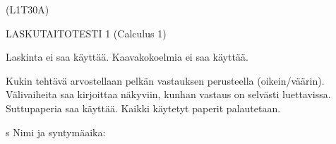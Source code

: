 \documentclass[finnish, a4paper, 12pt]{article}
\begin{document}
	
	
	\begin{flushright}
		(L1T30A)	%
	\end{flushright}
	
	\begin{center}
		{\large
			LASKUTAITOTESTI 1 (Calculus 1)}
	\end{center}
	
	Laskinta ei saa käyttää. Kaavakokoelmia ei saa käyttää.
	
	Kukin tehtävä arvostellaan pelkän vastauksen perusteella (oikein/väärin).
	Välivaiheita saa kirjoittaa näkyviin, kunhan vastaus on selvästi luettavissa.
	Suttupaperia saa käyttää. Kaikki käytetyt paperit palautetaan.
	
s\vspace{12pt}
Nimi ja syntymäaika: \phantom{m} \hrulefill
\vspace{8pt}
	
\end{document}
